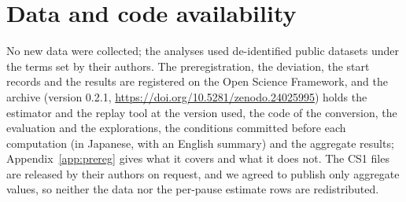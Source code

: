 \section*{Data and code availability}
\label{sec:availability}

No new data were collected; the analyses used de-identified public datasets under the terms set by their authors. The
preregistration, the deviation, the start records and the results are registered on the Open Science Framework, and the
archive (version 0.2.1, \url{https://doi.org/10.5281/zenodo.24025995}) holds the estimator and the replay tool at the version used, the code of the
conversion, the evaluation and the explorations, the conditions committed before each computation (in Japanese, with an
English summary) and the aggregate results; Appendix~\ref{app:prereg} gives what it covers and what it does not. The CS1
files are released by their authors on request, and we agreed to publish only aggregate values, so neither the data nor
the per-pause estimate rows are redistributed.
